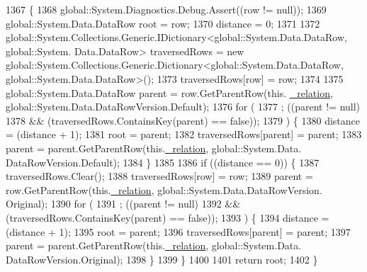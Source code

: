 \begin{DoxyCode}
1367                                                                                                        \{
1368                 global::System.Diagnostics.Debug.Assert((row != null));
1369                 global::System.Data.DataRow root = row;
1370                 distance = 0;
1371 
1372                 global::System.Collections.Generic.IDictionary<global::System.Data.DataRow, global::System.
      Data.DataRow> traversedRows = \textcolor{keyword}{new} global::System.Collections.Generic.Dictionary<global::System.Data.DataRow,
       global::System.Data.DataRow>();
1373                 traversedRows[row] = row;
1374 
1375                 global::System.Data.DataRow parent = row.GetParentRow(this.
      \hyperlink{class_proyecto___integrador__3_1_1ds_servicios_table_adapters_1_1_table_adapter_manager_1_1_self_reference_comparer_a88115b67b87d4305d472d5fa124304b0}{\_relation}, global::System.Data.DataRowVersion.Default);
1376                 \textcolor{keywordflow}{for} (
1377                 ; ((parent != null) 
1378                             && (traversedRows.ContainsKey(parent) == \textcolor{keyword}{false})); 
1379                 ) \{
1380                     distance = (distance + 1);
1381                     root = parent;
1382                     traversedRows[parent] = parent;
1383                     parent = parent.GetParentRow(this.\hyperlink{class_proyecto___integrador__3_1_1ds_servicios_table_adapters_1_1_table_adapter_manager_1_1_self_reference_comparer_a88115b67b87d4305d472d5fa124304b0}{\_relation}, global::System.Data.
      DataRowVersion.Default);
1384                 \}
1385 
1386                 \textcolor{keywordflow}{if} ((distance == 0)) \{
1387                     traversedRows.Clear();
1388                     traversedRows[row] = row;
1389                     parent = row.GetParentRow(this.\hyperlink{class_proyecto___integrador__3_1_1ds_servicios_table_adapters_1_1_table_adapter_manager_1_1_self_reference_comparer_a88115b67b87d4305d472d5fa124304b0}{\_relation}, global::System.Data.DataRowVersion.
      Original);
1390                     \textcolor{keywordflow}{for} (
1391                     ; ((parent != null) 
1392                                 && (traversedRows.ContainsKey(parent) == \textcolor{keyword}{false})); 
1393                     ) \{
1394                         distance = (distance + 1);
1395                         root = parent;
1396                         traversedRows[parent] = parent;
1397                         parent = parent.GetParentRow(this.\hyperlink{class_proyecto___integrador__3_1_1ds_servicios_table_adapters_1_1_table_adapter_manager_1_1_self_reference_comparer_a88115b67b87d4305d472d5fa124304b0}{\_relation}, global::System.Data.
      DataRowVersion.Original);
1398                     \}
1399                 \}
1400 
1401                 \textcolor{keywordflow}{return} root;
1402             \}
\end{DoxyCode}


